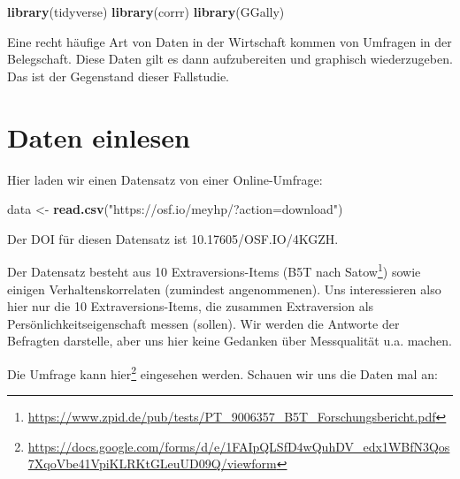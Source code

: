 \documentclass[12pt,ngerman,]{book}
\makeatletter
\newenvironment{Shaded}{\begin{snugshade}}{\end{snugshade}}
\newcommand{\KeywordTok}[1]{\textcolor[rgb]{0.13,0.29,0.53}{\textbf{{#1}}}}
\newcommand{\StringTok}[1]{\textcolor[rgb]{0.31,0.60,0.02}{{#1}}}
\newcommand{\NormalTok}[1]{{#1}}
\let\rmarkdownfootnote\footnote%
\def\footnote{\protect\rmarkdownfootnote}
\newenvironment{kframe}{%
\medskip{}
\setlength{\fboxsep}{.8em}
 \def\at@end@of@kframe{}%
 \ifinner\ifhmode%
  \def\at@end@of@kframe{\end{minipage}}%
  \begin{minipage}{\columnwidth}%
 \fi\fi%
 \def\FrameCommand##1{\hskip\@totalleftmargin \hskip-\fboxsep
 \colorbox{shadecolor}{##1}\hskip-\fboxsep
     \hskip-\linewidth \hskip-\@totalleftmargin \hskip\columnwidth}%
 \MakeFramed {\advance\hsize-\width
   \@totalleftmargin\z@ \linewidth\hsize
   \@setminipage}}%
 {\par\unskip\endMakeFramed%
 \at@end@of@kframe}
\renewenvironment{Shaded}{\begin{kframe}}{\end{kframe}}
\makeatother
\begin{document}
\begin{Shaded}
\begin{Highlighting}[]
\KeywordTok{library}\NormalTok{(tidyverse)}
\KeywordTok{library}\NormalTok{(corrr)}
\KeywordTok{library}\NormalTok{(GGally)}
\end{Highlighting}
\end{Shaded}

Eine recht häufige Art von Daten in der Wirtschaft kommen von Umfragen
in der Belegschaft. Diese Daten gilt es dann aufzubereiten und graphisch
wiederzugeben. Das ist der Gegenstand dieser Fallstudie.

\section{Daten einlesen}\label{daten-einlesen-1}

Hier laden wir einen Datensatz von einer Online-Umfrage:

\begin{Shaded}
\begin{Highlighting}[]
\NormalTok{data <-}\StringTok{ }\KeywordTok{read.csv}\NormalTok{(}\StringTok{"https://osf.io/meyhp/?action=download"}\NormalTok{)}
\end{Highlighting}
\end{Shaded}

Der DOI für diesen Datensatz ist 10.17605/OSF.IO/4KGZH.

Der Datensatz besteht aus 10 Extraversions-Items (B5T nach
Satow\footnote{\url{https://www.zpid.de/pub/tests/PT_9006357_B5T_Forschungsbericht.pdf}})
sowie einigen Verhaltenskorrelaten (zumindest angenommenen). Uns
interessieren also hier nur die 10 Extraversions-Items, die zusammen
Extraversion als Persönlichkeitseigenschaft messen (sollen). Wir werden
die Antworte der Befragten darstelle, aber uns hier keine Gedanken über
Messqualität u.a. machen.

Die Umfrage kann hier\footnote{\url{https://docs.google.com/forms/d/e/1FAIpQLSfD4wQuhDV_edx1WBfN3Qos7XqoVbe41VpiKLRKtGLeuUD09Q/viewform}}
eingesehen werden. Schauen wir uns die Daten mal an:
\end{document}
